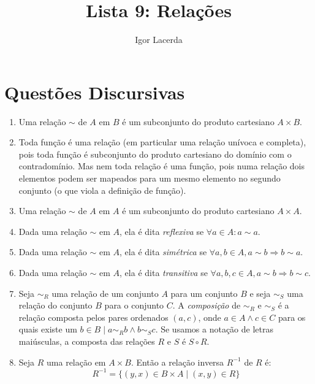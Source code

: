 \documentclass{article}
\title{Lista 9: Relações}
\author{Igor Lacerda}
\begin{document}
\maketitle

\section*{Questões Discursivas}

\begin{enumerate}

	\item Uma relação \( \sim \) de \( A \) em \( B \) é um subconjunto do produto cartesiano \( A \times B \).

	\item Toda função é uma relação (em particular uma relação unívoca e completa), pois toda função é subconjunto do produto cartesiano do domínio com o contradomínio. Mas nem toda relação é uma função, pois numa relação dois elementos podem ser mapeados para um mesmo elemento no segundo conjunto (o que viola a definição de função).

	\item Uma relação \( \sim \) de \( A \) em \( A \) é um subconjunto do produto cartesiano \( A \times A \).

	\item Dada uma relação \( \sim \) em \( A \), ela é dita \textit{reflexiva} se \( \forall a \in A: a \sim a\).

	\item Dada uma relação \( \sim \) em \( A \), ela é dita \textit{simétrica} se \( \forall a,b \in A, a \sim b \Rightarrow b \sim a \).

	\item Dada uma relação \( \sim \) em \( A \), ela é dita \textit{transitiva} se \( \forall a,b,c \in A, a \sim b \Rightarrow b \sim c\).

	\item Seja \( \sim _R \) uma relação de um conjunto \( A \) para um conjunto \( B \) e seja \( \sim _S \) uma relação do conjunto \( B \) para o conjunto \( C \). A \textit{composição} de \( \sim _R\) e \( \sim _S \) é a relação composta pelos pares ordenados \( (a,c) \), onde \( a \in A \land c \in C \) para os quais existe um \( b \in B \mid a \sim _R b \land b \sim _S c \). Se usamos a notação de letras maiúsculas, a composta das relações \( R \) e \( S \) é \( S \circ R \).

	\item Seja \( R \) uma relação em \( A \times B \). Então a relação inversa \( R^{-1} \) de \( R \) é:
	      \[ R^{-1} = \{ (y,x) \in B \times A \mid (x,y) \in R\} \]


\end{enumerate}
\end{document}
